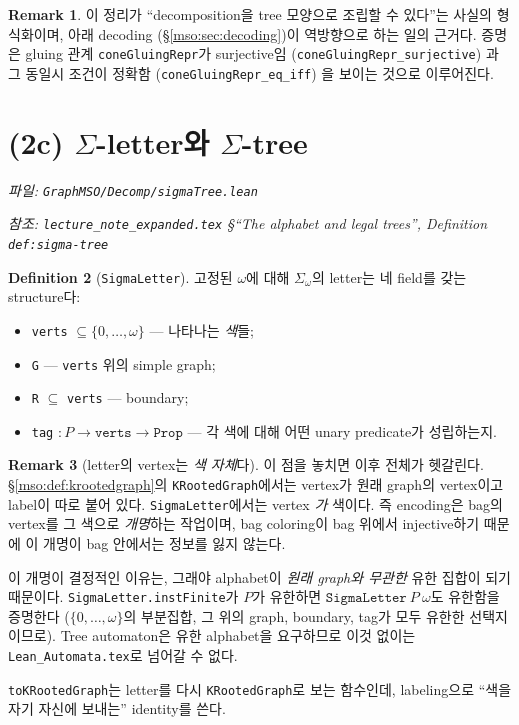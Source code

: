\documentclass[11pt]{article}
\theoremstyle{definition}
\newtheorem{definition}{Definition}[section]
\newtheorem{remark}[definition]{Remark}
\theoremstyle{plain}
\newcommand{\lean}[1]{\texttt{#1}}
\newcommand{\leanfile}[1]{\texttt{#1}}
\begin{document}
\begin{remark}
이 정리가 ``decomposition을 tree 모양으로 조립할 수 있다''는 사실의 형식화이며,
아래 decoding (\S\ref{mso:sec:decoding})이 역방향으로 하는 일의 근거다.
증명은 gluing 관계 \lean{coneGluingRepr}가 surjective임
(\lean{coneGluingRepr\_surjective}) 과 그 동일시 조건이 정확함
(\lean{coneGluingRepr\_eq\_iff}) 을 보이는 것으로 이루어진다.
\end{remark}

\section{(2c) \texorpdfstring{$\Sigma$}{Sigma}-letter와 \texorpdfstring{$\Sigma$}{Sigma}-tree}
\label{mso:sec:sigmatree}

\emph{파일: \leanfile{GraphMSO/Decomp/sigmaTree.lean}}

\emph{참조: \leanfile{lecture\_note\_expanded.tex} \S``The alphabet and legal
trees'', Definition \lean{def:sigma-tree}}

\begin{definition}[\lean{SigmaLetter}]
\label{mso:def:sigmaletter}
고정된 $\omega$에 대해 $\Sigma_\omega$의 letter는 네 field를 갖는 structure다:
\begin{itemize}
  \item \lean{verts} $\subseteq \{0,\dots,\omega\}$ --- 나타나는 \emph{색}들;
  \item \lean{G} --- \lean{verts} 위의 simple graph;
  \item \lean{R} $\subseteq$ \lean{verts} --- boundary;
  \item \lean{tag} $: P \to \lean{verts} \to \lean{Prop}$ --- 각 색에 대해
    어떤 unary predicate가 성립하는지.
\end{itemize}
\end{definition}

\begin{remark}[letter의 vertex는 \emph{색 자체}다]
\label{mso:rem:lettercolors}
이 점을 놓치면 이후 전체가 헷갈린다. \S\ref{mso:def:krootedgraph}의
\lean{KRootedGraph}에서는 vertex가 원래 graph의 vertex이고 label이 따로
붙어 있다. \lean{SigmaLetter}에서는 vertex \emph{가} 색이다. 즉 encoding은
bag의 vertex를 그 색으로 \emph{개명}하는 작업이며, bag coloring이
bag 위에서 injective하기 때문에 이 개명이 bag 안에서는 정보를 잃지 않는다.

이 개명이 결정적인 이유는, 그래야 alphabet이 \emph{원래 graph와 무관한}
유한 집합이 되기 때문이다. \lean{SigmaLetter.instFinite}가 $P$가 유한하면
$\lean{SigmaLetter}\ P\ \omega$도 유한함을 증명한다 ($\{0,\dots,\omega\}$의
부분집합, 그 위의 graph, boundary, tag가 모두 유한한 선택지이므로).
Tree automaton은 유한 alphabet을 요구하므로 이것 없이는
\leanfile{Lean\_Automata.tex}로 넘어갈 수 없다.

\lean{toKRootedGraph}는 letter를 다시 \lean{KRootedGraph}로 보는 함수인데,
labeling으로 ``색을 자기 자신에 보내는'' identity를 쓴다.
\end{remark}
\end{document}
